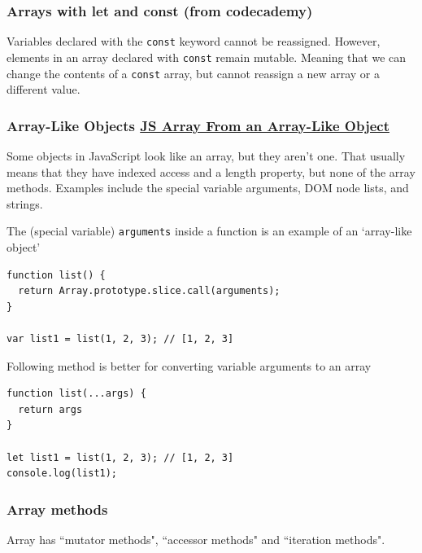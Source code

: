 \documentclass[a4paper, 12pt]{article}
\begin{document}
\subsubsection{Arrays with let and const (from codecademy)}
Variables declared with the \verb|const| keyword cannot be reassigned. However, elements in an array declared with \verb|const| remain mutable. Meaning that we can change the contents of a \verb|const| array, but cannot reassign a new array or a different value.

\subsubsection{Array-Like Objects \href{https://dzone.com/articles/js-array-from-an-array-like-object}{JS Array From an Array-Like Object}}
Some objects in JavaScript look like an array, but they aren't one. That usually means that they have indexed access and a length property, but none of the array methods. Examples include the special variable arguments, DOM node lists, and strings.

The (special variable) \verb|arguments| inside a function is an example of an `array-like object'
\begin{verbatim}
function list() {
  return Array.prototype.slice.call(arguments);
}

var list1 = list(1, 2, 3); // [1, 2, 3]
\end{verbatim}

Following method is better for converting variable arguments to an array
\begin{verbatim}
function list(...args) {
  return args
}

let list1 = list(1, 2, 3); // [1, 2, 3]
console.log(list1);
\end{verbatim}

\subsubsection{Array methods}
Array has ``mutator methods", ``accessor methods" and ``iteration methods".
\end{document}

